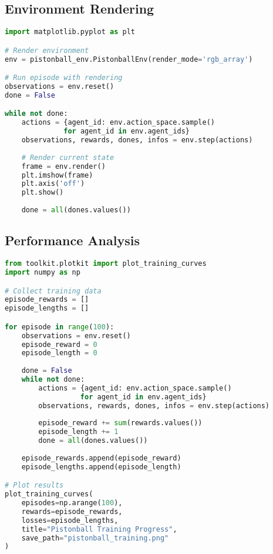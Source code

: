 \subsection{Environment Rendering}

\begin{lstlisting}[language=python, caption=Environment Rendering]
import matplotlib.pyplot as plt

# Render environment
env = pistonball_env.PistonballEnv(render_mode='rgb_array')

# Run episode with rendering
observations = env.reset()
done = False

while not done:
    actions = {agent_id: env.action_space.sample() 
              for agent_id in env.agent_ids}
    observations, rewards, dones, infos = env.step(actions)
    
    # Render current state
    frame = env.render()
    plt.imshow(frame)
    plt.axis('off')
    plt.show()
    
    done = all(dones.values())
\end{lstlisting}

\subsection{Performance Analysis}

\begin{lstlisting}[language=python, caption=Performance Analysis]
from toolkit.plotkit import plot_training_curves
import numpy as np

# Collect training data
episode_rewards = []
episode_lengths = []

for episode in range(100):
    observations = env.reset()
    episode_reward = 0
    episode_length = 0
    
    done = False
    while not done:
        actions = {agent_id: env.action_space.sample() 
                  for agent_id in env.agent_ids}
        observations, rewards, dones, infos = env.step(actions)
        
        episode_reward += sum(rewards.values())
        episode_length += 1
        done = all(dones.values())
    
    episode_rewards.append(episode_reward)
    episode_lengths.append(episode_length)

# Plot results
plot_training_curves(
    episodes=np.arange(100),
    rewards=episode_rewards,
    losses=episode_lengths,
    title="Pistonball Training Progress",
    save_path="pistonball_training.png"
)
\end{lstlisting}

